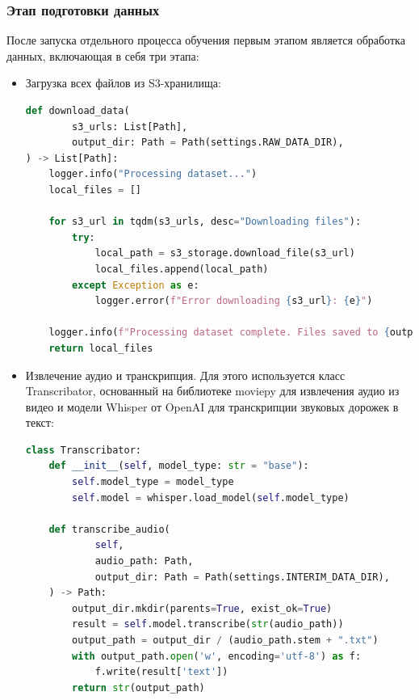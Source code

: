 \subsubsection{Этап подготовки данных}
После запуска отдельного процесса обучения первым этапом является обработка данных, включающая в себя три этапа:
\begin{itemize}
\item Загрузка всех файлов из S3-хранилища:
\begin{lstlisting}[language=Python, numbers=none, frame=none]
def download_data(
        s3_urls: List[Path],
        output_dir: Path = Path(settings.RAW_DATA_DIR),
) -> List[Path]:
    logger.info("Processing dataset...")
    local_files = []

    for s3_url in tqdm(s3_urls, desc="Downloading files"):
        try:
            local_path = s3_storage.download_file(s3_url)
            local_files.append(local_path)
        except Exception as e:
            logger.error(f"Error downloading {s3_url}: {e}")

    logger.info(f"Processing dataset complete. Files saved to {output_dir}")
    return local_files
\end{lstlisting}
\item Извлечение аудио и транскрипция.  Для этого используется класс Transcribator, основанный на библиотеке moviepy для извлечения аудио из видео и модели Whisper от OpenAI для транскрипции звуковых дорожек в текст:
\begin{lstlisting}[language=Python, numbers=none, frame=none]
class Transcribator:
    def __init__(self, model_type: str = "base"):
        self.model_type = model_type
        self.model = whisper.load_model(self.model_type)

    def transcribe_audio(
            self,
            audio_path: Path,
            output_dir: Path = Path(settings.INTERIM_DATA_DIR),
    ) -> Path:
        output_dir.mkdir(parents=True, exist_ok=True)
        result = self.model.transcribe(str(audio_path))
        output_path = output_dir / (audio_path.stem + ".txt")
        with output_path.open('w', encoding='utf-8') as f:
            f.write(result['text'])
        return str(output_path)


\end{lstlisting}
\end{itemize}
